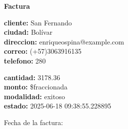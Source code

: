 \documentclass{article}
\begin{document}
\begin{center}
    {\LARGE \textbf{Factura}}\\[1cm]
\end{center}

\textbf{cliente:} San Fernando \\
\textbf{ciudad:} Bolívar \\
\textbf{direccion:} enriqueospina@example.com \\
\textbf{correo:} (+57)3063916135 \\
\textbf{telefono:} 280 \\

\vspace{0.5cm}

\textbf{cantidad:} 3178.36 \\
\textbf{monto:} \$fraccionada \\
\textbf{modalidad:} exitoso \\
\textbf{estado:} 2025-06-18 09:38:55.228895 \\

\vspace{1cm}

Fecha de la factura: 
\end{document}
